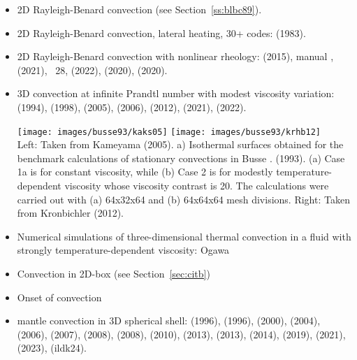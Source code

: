 \begin{itemize}
\item 2D Rayleigh-Benard convection (see Section~\ref{ss:blbc89}).

\item 2D Rayleigh-Benard convection, lateral heating, 30+ codes: 
      \textcite{dejo83} (1983).

\item 2D Rayleigh-Benard convection with nonlinear rheology:  
      \textcite{tosn15} (2015), \aspect{} manual \cite{aspectmanual}, 
      \textcite{trbs21} (2021), \stone~28, \textcite{dakg22} (2022),
      \textcite{siwi20} (2020), \textcite{casd20} (2020).

\item 3D convection at infinite Prandtl number with modest viscosity variation:
      \textcite{bucc94} (1994),
      \textcite{trha98} (1998),
      \textcite{kaks05} (2005),
      \textcite{onmm06} (2006),
      \textcite{krhb12} (2012), 
      \textcite{trbs21} (2021),
      \textcite{dakg22} (2022).

      \begin{center}
      \texttt{[image: images/busse93/kaks05]}
      \texttt{[image: images/busse93/krhb12]}\\
      {\captionfont Left: Taken from Kameyama \etal (2005).
      a) Isothermal surfaces obtained for the benchmark calculations 
      of stationary convections in Busse \etal. (1993). (a) Case 1a is for
      constant viscosity, while (b) Case 2 is for modestly temperature-dependent 
      viscosity whose viscosity contrast is 20. The calculations
      were carried out with (a) 64x32x64 and (b) 64x64x64 mesh divisions.
      Right: Taken from Kronbichler \etal (2012).}
      \end{center}

\item Numerical simulations of three-dimensional thermal convection 
      in a fluid with strongly
      temperature-dependent viscosity: Ogawa \etal \cite{ogsz91,kaks05} 

\item Convection in 2D-box \cite{galb19} (see Section~\ref{sec:citb})

\item Onset of convection \cite{aspectmanual}

\item mantle convection in 3D spherical shell:
      \textcite{rasz96} (1996),
      \textcite{iwas96} (1996),
      \textcite{zhzm00} (2000),
      \textcite{yoka04} (2004),
      \textcite{sthh06} (2006),
      \textcite{chcc07} (2007),
      \textcite{zhmt08} (2008),
      \textcite{kaks08} (2008),
      \textcite{wrfy10} (2010),
      \textcite{dadb13} (2013),
      \textcite{busa13} (2013),
      \textcite{arfw14} (2014),
      \textcite{liki19} (2019),
      \textcite{trbs21} (2021),
      \textcite{eulg23} (2023),
      \textcite{ildk24} (ildk24).


\end{itemize}
